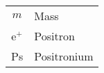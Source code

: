 \begin{tabular}{cp{}}
  $m$		& Mass \\
  e$^+$		& Positron \\
  Ps		& Positronium \\
\end{tabular}\\
